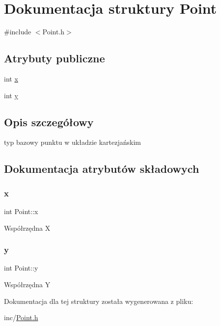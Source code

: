 \hypertarget{struct_point}{}\section{Dokumentacja struktury Point}
\label{struct_point}


{\ttfamily \#include $<$Point.\+h$>$}

\subsection*{Atrybuty publiczne}
\begin{DoxyCompactItemize}
\item 
int \mbox{\hyperlink{struct_point_a8c779e11e694b20e0946105a9f5de842}{x}}
\item 
int \mbox{\hyperlink{struct_point_a2e1b5fb2b2a83571f5c0bc0f66a73cf7}{y}}
\end{DoxyCompactItemize}


\subsection{Opis szczegółowy}
typ bazowy punktu w układzie kartezjańskim 

\subsection{Dokumentacja atrybutów składowych}
\mbox{\label{struct_point_a8c779e11e694b20e0946105a9f5de842}} 
\subsubsection{\texorpdfstring{x}{x}}
{\footnotesize\ttfamily int Point\+::x}

Współrzędna X \mbox{\label{struct_point_a2e1b5fb2b2a83571f5c0bc0f66a73cf7}} 
\subsubsection{\texorpdfstring{y}{y}}
{\footnotesize\ttfamily int Point\+::y}

Współrzędna Y 

Dokumentacja dla tej struktury została wygenerowana z pliku\+:\begin{DoxyCompactItemize}
\item 
inc/\mbox{\hyperlink{_point_8h}{Point.\+h}}\end{DoxyCompactItemize}
